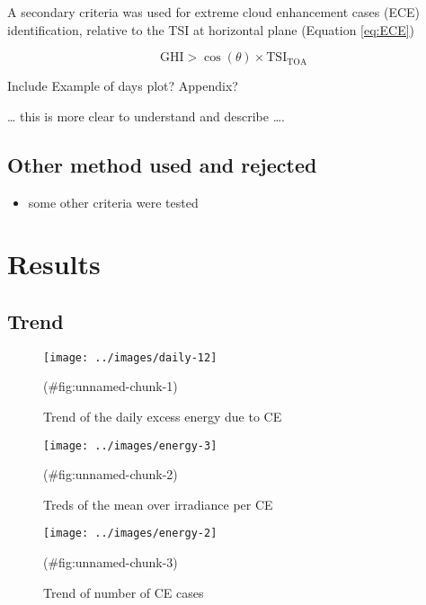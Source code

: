 \documentclass[
]{article}
\providecommand{\tightlist}{%
  \setlength{\itemsep}{0pt}\setlength{\parskip}{0pt}}
\begin{document}
A secondary criteria was used for extreme cloud enhancement cases (ECE) identification, relative to the TSI at horizontal plane (Equation \ref{eq:ECE})

\begin{equation}
\text{GHI} > \cos(\theta) \times \text{TSI}_\text{TOA}
\label{eq:ECE}
\end{equation}

Include Example of days plot? Appendix?

\ldots{} this is more clear to understand and describe \ldots.

\hypertarget{other-method-used-and-rejected}{%
\subsection{Other method used and rejected}\label{other-method-used-and-rejected}}

\begin{itemize}
\tightlist
\item
  some other criteria were tested
\end{itemize}

\FloatBarrier

\hypertarget{results}{%
\section{Results}\label{results}}

\hypertarget{trend}{%
\subsection{Trend}\label{trend}}

\begin{figure}[h!]

{\centering \texttt{[image: ../images/daily-12]} 

}

\caption{Trend of the daily excess energy due to CE}(\#fig:unnamed-chunk-1)
\end{figure}

\begin{figure}[h!]

{\centering \texttt{[image: ../images/energy-3]} 

}

\caption{Treds of the mean over irradiance per CE}(\#fig:unnamed-chunk-2)
\end{figure}

\begin{figure}[h!]

{\centering \texttt{[image: ../images/energy-2]} 

}

\caption{Trend of number of CE cases}(\#fig:unnamed-chunk-3)
\end{figure}
\end{document}

